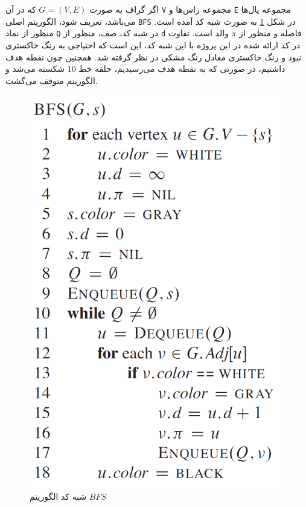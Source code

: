 اگر گراف به صورت 
$G = (V, E)$
که در آن \verb|V| مجموعه راس‌ها و \verb|E| مجموعه یال‌ها می‌باشد، تعریف شود، الگوریتم اصلی \verb|BFS| در شکل \ref{Fig BFS Algorithm} به صورت شبه کد آمده است. منظور از نماد \verb|Q| در شبه کد، صف، منظور از \verb|d| فاصله و منظور از $\pi$ والد است. تفاوت در کد ارائه شده در این پروژه با این شبه کد، این است که احتیاجی به رنگ خاکستری نبود و رنگ خاکستری معادل رنگ مشکی در نظر گرفته شد. همچنین چون نقطه هدف داشتیم، در صورتی که به نقطه هدف می‌رسیدیم، حلقه خط 10 شکسته می‌شد و الگوریتم متوقف می‌گشت.
\begin{figure}[!h]
	\centering
	\includegraphics[scale=0.4]{Images/BFS-algorithm.png}
	\caption{شبه کد الگوریتم $BFS$}\label{Fig BFS Algorithm}
\end{figure}

